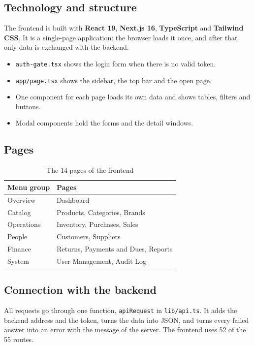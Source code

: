 \documentclass[11pt,a4paper]{article}
\newcommand{\code}[1]{\texttt{#1}}
\begin{document}
\subsection{Technology and structure}
The frontend is built with \textbf{React 19}, \textbf{Next.js 16}, \textbf{TypeScript} and \textbf{Tailwind CSS}. It is a single-page application: the browser loads it once, and after that only data is exchanged with the backend.
\begin{itemize}
  \item \code{auth-gate.tsx} shows the login form when there is no valid token.
  \item \code{app/page.tsx} shows the sidebar, the top bar and the open page.
  \item One component for each page loads its own data and shows tables, filters and buttons.
  \item Modal components hold the forms and the detail windows.
\end{itemize}

\subsection{Pages}
\begin{table}[H]
\centering
\begin{tabularx}{\textwidth}{@{}P{2.4cm}Y@{}}
\toprule
\textbf{Menu group} & \textbf{Pages} \\
\midrule
Overview & Dashboard \\
Catalog & Products, Categories, Brands \\
Operations & Inventory, Purchases, Sales \\
People & Customers, Suppliers \\
Finance & Returns, Payments and Dues, Reports \\
System & User Management, Audit Log \\
\bottomrule
\end{tabularx}
\caption{The 14 pages of the frontend}
\end{table}

\subsection{Connection with the backend}
All requests go through one function, \code{apiRequest} in \code{lib/api.ts}. It adds the backend address and the token, turns the data into JSON, and turns every failed answer into an error with the message of the server. The frontend uses 52 of the 55 routes.
\end{document}
